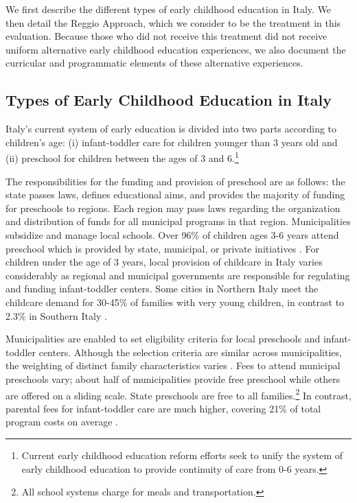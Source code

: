 We first describe the different types of early childhood education in Italy. We then detail the Reggio Approach, which we consider to be the treatment in this evaluation. Because those who did not receive this treatment did not receive uniform alternative early childhood education experiences, we also document the curricular and programmatic elements of these alternative experiences.

\subsection{Types of Early Childhood Education in Italy}

Italy's current system of early education is divided into two parts according to children's age: (i) infant-toddler care for children younger than 3 years old and (ii) preschool for children between the ages of 3 and 6.\footnote{Current early childhood education reform efforts seek to unify the system of early childhood education to provide continuity of care from 0-6 years.} 

The responsibilities for the funding and provision of preschool are as follows: the state passes laws, defines educational aims, and provides the majority of funding for preschools to regions. Each region may pass laws regarding the organization and distribution of funds for all municipal programs in that region. Municipalities subsidize and manage local schools. Over 96\% of children ages 3-6 years attend preschool which is provided by state, municipal, or private initiatives \citep{Becchi-Ferrari_1990_Pub-Inf-Centres-Italy}. For children under the age of 3 years, local provision of childcare in Italy varies considerably as regional and municipal governments are responsible for regulating and funding infant-toddler centers. Some cities in Northern Italy meet the childcare demand for 30-45\% of families with very young children, in contrast to 2.3\% in Southern Italy \citep{Musatti-Picchio_2010_IJEC}. 

Municipalities are enabled to set eligibility criteria for local preschools and infant-toddler centers. Although the selection criteria are similar across municipalities, the weighting of distinct family characteristics varies \citep{Del-Boca-etal_2016_CESifo-ES}. Fees to attend municipal preschools vary; about half of municipalities provide free preschool while others are offered on a sliding scale. State preschools are free to all families.\footnote{All school systems charge for meals and transportation.} In contrast, parental fees for infant-toddler care are much higher, covering 21\% of total program costs on average \citep{Musatti-Picchio_2010_IJEC}. 

